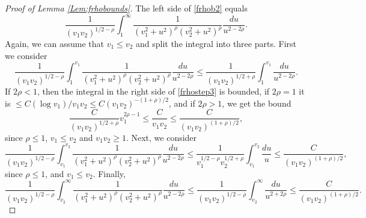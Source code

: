 \documentclass{article}
\numberwithin{equation}{section}
\numberwithin{figure}{section}
\theoremstyle{plain}
\theoremstyle{plain}
\numberwithin{thm}{section}
\theoremstyle{remark}
\let \le \leqslant
\let \ge \geqslant
\begin{document}
\begin{proof}[Proof of Lemma \ref{Lem:frhobounds}]
The left side of \eqref{frhob2} equals
\begin{equation*}
\frac 1{(v_1v_2)^{1/2-\rho}}\int_1^\infty\frac 1{(v_1^2+u^2)^\rho(v_2^2+u^2)^\rho}\frac{du}{u^{2-2\rho}}.
\end{equation*}
Again, we can assume that $v_1\le v_2$ and split the integral into three parts. First we consider
\begin{equation}\label{frhostep3}
\frac 1{(v_1v_2)^{1/2-\rho}}\int_1^{v_1}\frac 1{(v_1^2+u^2)^\rho(v_2^2+u^2)^\rho}\frac{du}{u^{2-2\rho}}\le
\frac 1{(v_1v_2)^{1/2+\rho}}\int_1^{v_1}\frac{du}{u^{2-2\rho}}.
\end{equation}
If $2\rho<1$, then the integral in the right side of \eqref{frhostep3} is bounded, if $2\rho=1$ it is $\le C(\log v_1)/v_1v_2\le C(v_1v_2)^{-(1+\rho)/2}$, and if
$2\rho>1$, we get the bound
\begin{equation*}
\frac C{(v_1v_2)^{1/2+\rho}}v_1^{2\rho-1}\le\frac C{v_1v_2}\le \frac C{(v_1v_2)^{(1+\rho)/2}},
\end{equation*}
since $\rho\le 1$, $v_1\le v_2$ and $v_1v_2\ge 1$. Next, we consider
\begin{equation*}
\frac 1{(v_1v_2)^{1/2-\rho}}\int_{v_1}^{v_2}\frac 1{(v_1^2+u^2)^\rho(v_2^2+u^2)^\rho}\frac{du}{u^{2-2\rho}}\le \frac 1{v_1^{1/2-\rho}v_2^{1/2+\rho}}
\int_{v_1}^{v_2}\frac{du}u\le \frac C{(v_1v_2)^{(1+\rho)/2}},
\end{equation*}
since $\rho\le 1$, and $v_1\le v_2$. Finally,
\begin{equation*}
\frac 1{(v_1v_2)^{1/2-\rho}}\int_{v_2}^{\infty}\frac 1{(v_1^2+u^2)^\rho(v_2^2+u^2)^\rho}\frac{du}{u^{2-2\rho}}\le \frac 1{(v_1v_2)^{1/2-\rho}}\int_{v_2}^{\infty}
\frac{du}{u^{2+2\rho}}\le\frac C{(v_1v_2)^{(1+\rho)/2}}.
\end{equation*}


\end{proof}
\end{document}
